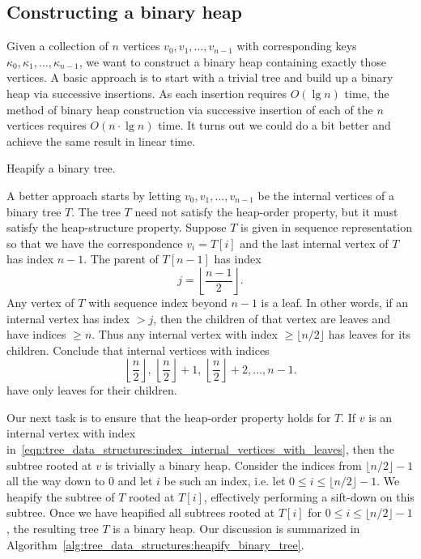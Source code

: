
\subsection{Constructing a binary heap}

Given a collection of $n$ vertices $v_0, v_1, \dots, v_{n-1}$ with
corresponding keys $\kappa_0, \kappa_1, \dots, \kappa_{n-1}$, we want
to construct a binary heap containing exactly those vertices. A basic
approach is to start with a trivial tree and build up a binary heap
via successive insertions. As each insertion requires $O(\lg n)$ time,
the method of binary heap construction via successive insertion of
each of the $n$ vertices requires $O(n \cdot \lg n)$ time. It turns
out we could do a bit better and achieve the same result in linear
time.

\begin{algorithm}[!htbp]

\caption{Heapify a binary tree.}
\label{alg:tree_data_structures:heapify_binary_tree}
\end{algorithm}

A better approach starts by letting $v_0, v_1, \dots, v_{n-1}$ be the
internal vertices of a binary tree $T$. The tree $T$ need not satisfy
the heap-order property, but it must satisfy the heap-structure
property. Suppose $T$ is given in sequence representation so that we
have the correspondence $v_i = T[i]$ and the last internal vertex of
$T$ has index $n - 1$. The parent of $T[n-1]$ has index
\[
j
=
\left\lfloor \frac{n - 1}{2} \right\rfloor.
\]
Any vertex of $T$ with sequence index beyond $n - 1$ is a leaf. In
other words, if an internal vertex has index $> j$, then the children
of that vertex are leaves and have indices $\geq n$. Thus any internal
vertex with index $\geq \lfloor n/2 \rfloor$ has leaves for its
children. Conclude that internal vertices with indices
\begin{equation}
\label{eqn:tree_data_structures:index_internal_vertices_with_leaves}
\left\lfloor \frac{n}{2} \right\rfloor,\,
\left\lfloor \frac{n}{2} \right\rfloor + 1,\,
\left\lfloor \frac{n}{2} \right\rfloor + 2,
\dots,
n - 1.
\end{equation}
have only leaves for their children.

Our next task is to ensure that the heap-order property holds for
$T$. If $v$ is an internal vertex with index
in~\eqref{eqn:tree_data_structures:index_internal_vertices_with_leaves},
then the subtree rooted at $v$ is trivially a binary heap. Consider
the indices from $\lfloor n / 2 \rfloor - 1$ all the way down to
$0$ and let $i$ be such an index, i.e. let
$0 \leq i \leq \lfloor n / 2 \rfloor - 1$. We heapify the subtree of
$T$ rooted at $T[i]$, effectively performing a sift-down on this
subtree. Once we have heapified all subtrees rooted at $T[i]$ for
$0 \leq i \leq \lfloor n / 2 \rfloor - 1$, the resulting tree $T$ is a
binary heap. Our discussion is summarized in
Algorithm~\ref{alg:tree_data_structures:heapify_binary_tree}.

